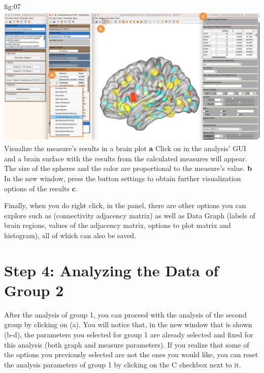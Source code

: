 \documentclass[justified]{tufte-handout}
\begin{document}
	{fig:07}
	{
	\includegraphics{fig07.jpg}
	}
	{Visualize the measure's results in a brain plot}
	{
	{\bf a} Click on  in the analysis' GUI and a brain surface with the results from the calculated measures will appear. The size of the spheres and the color are proportional to the measure's value.   
        {\bf b} In the new window, press the button settings to obtain further visualization options of the results {\bf c}. 
	}
 
 Finally, when you do right click, in the  panel, there are other options you can explore such as  (connectivity adjacency matrix) as well as Data Graph (labels of brain regions, values of the adjacency matrix, options to plot matrix and histogram), all of which can also be saved.
  
\section{Step 4: Analyzing the Data of Group 2}

After the analysis of group 1, you can proceed with the analysis of the second group by clicking on  (a). You will notice that, in the new window that is shown (b-d), the parameters you selected for group 1 are already selected and fixed for this analysis (both graph and measure parameters). If you realize that some of the options you previously selected are not the ones you would like, you can reset the analysis parameters of group 1 by clicking on the C checkbox next to it.
\end{document}
